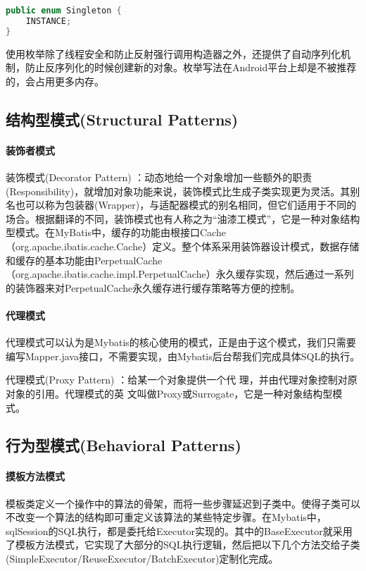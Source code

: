 \documentclass[../../../interview-questions.tex]{subfiles}
\begin{document}
\begin{lstlisting}[language=Java]
public enum Singleton {
    INSTANCE;
}
\end{lstlisting}

使用枚举除了线程安全和防止反射强行调用构造器之外，还提供了自动序列化机制，防止反序列化的时候创建新的对象。枚举写法在Android平台上却是不被推荐的，会占用更多内存。


\subsection{结构型模式(Structural Patterns)}

\paragraph{装饰者模式}

装饰模式(Decorator Pattern) ：动态地给一个对象增加一些额外的职责(Responsibility)，就增加对象功能来说，装饰模式比生成子类实现更为灵活。其别名也可以称为包装器(Wrapper)，与适配器模式的别名相同，但它们适用于不同的场合。根据翻译的不同，装饰模式也有人称之为“油漆工模式”，它是一种对象结构型模式。在MyBatis中，缓存的功能由根接口Cache（org.apache.ibatis.cache.Cache）定义。整个体系采用装饰器设计模式，数据存储和缓存的基本功能由PerpetualCache（org.apache.ibatis.cache.impl.PerpetualCache）永久缓存实现，然后通过一系列的装饰器来对PerpetualCache永久缓存进行缓存策略等方便的控制。

\paragraph{代理模式}

代理模式可以认为是Mybatis的核心使用的模式，正是由于这个模式，我们只需要编写Mapper.java接口，不需要实现，由Mybatis后台帮我们完成具体SQL的执行。

代理模式(Proxy Pattern) ：给某一个对象提供一个代 理，并由代理对象控制对原对象的引用。代理模式的英 文叫做Proxy或Surrogate，它是一种对象结构型模式。

\subsection{行为型模式(Behavioral Patterns)}

\paragraph{摸板方法模式}

模板类定义一个操作中的算法的骨架，而将一些步骤延迟到子类中。使得子类可以不改变一个算法的结构即可重定义该算法的某些特定步骤。在Mybatis中，sqlSession的SQL执行，都是委托给Executor实现的。其中的BaseExecutor就采用了模板方法模式，它实现了大部分的SQL执行逻辑，然后把以下几个方法交给子类(SimpleExecutor/ReuseExecutor/BatchExecutor)定制化完成。
\end{document}
